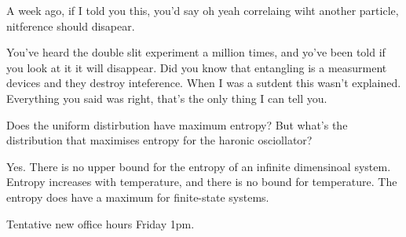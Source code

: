 A week ago,
if I told you this,
you'd say oh yeah correlaing wiht another particle,
nitference should disapear.

You've heard the double slit experiment a million times,
and yo've been told if you look at it it will disappear.
Did you know that entangling is a measurment devices and they destroy
inteference.
When I was a sutdent this wasn't explained.
Everything you said was right,
that's the only thing I can tell you.

\begin{question}
    Does the uniform distirbution have maximum entropy?
    But what's the distribution that maximises entropy for the haronic
    osciollator?
\end{question}
Yes.
There is no upper bound for the entropy of an infinite dimensinoal system.
Entropy increases with temperature,
and there is no bound for temperature.
The entropy does have a maximum for finite-state systems.

Tentative new office hours Friday 1pm.
